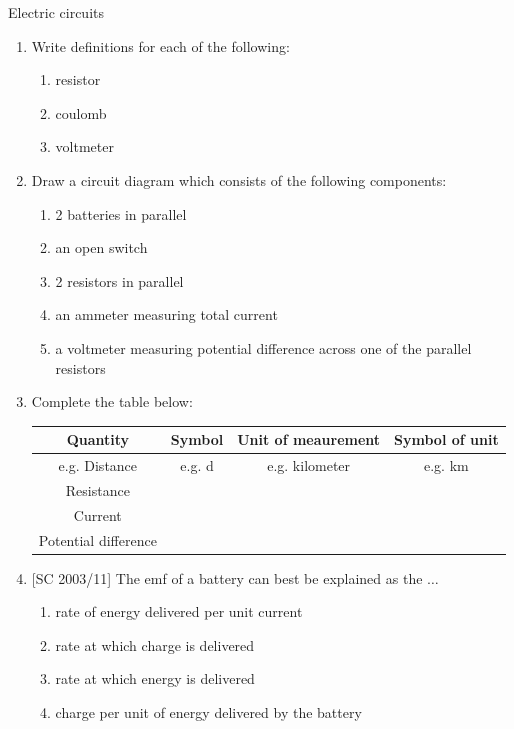 \begin{eocexercises}{Electric circuits}

\begin{enumerate}[noitemsep, label=\textbf{\arabic*}. ] 
\item{ Write definitions for each of the following:
  \begin{enumerate}[noitemsep, label=\textbf{\arabic*}. ] 
  \item resistor
  \item coulomb
  \item voltmeter
  \end{enumerate}}

\item{ Draw a circuit diagram which consists of the following components:
  \begin{enumerate}[noitemsep, label=\textbf{\arabic*}. ] 
  \item 2 batteries in parallel
  \item an open switch
  \item 2 resistors in parallel
  \item an ammeter measuring total current
  \item a voltmeter measuring potential difference across one of the parallel resistors
  \end{enumerate}}

\item{ Complete the table below: \\

\begin{tabular}{ | c | c | c | c| } \hline 
\textbf{Quantity} & \textbf{Symbol} & \textbf{Unit of meaurement} & \textbf{Symbol of unit} \\ \hline \hline 
e.g. Distance & e.g. d & e.g. kilometer & e.g. km \\ \hline 
Resistance &   &   &  \\ \hline
Current  &   &   &  \\ \hline
Potential difference  &   &   &  \\ \hline
\hline
\end{tabular}
}

\item{[SC 2003/11] The emf of a battery can best be explained as the $\dots$
\begin{enumerate}[noitemsep, label=\textbf{\arabic*}. ] 
\item{rate of energy delivered per unit current}
\item{rate at which charge is delivered}
\item{rate at which energy is delivered}
\item{charge per unit of energy delivered by the battery}
\end{enumerate}}


\end{enumerate}
\end{eocexercises}
